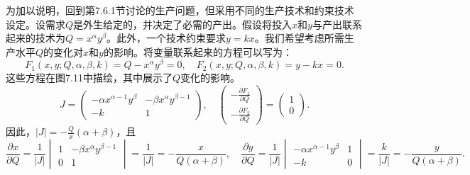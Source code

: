 \begin{translation}
为加以说明，回到第7.6.1节讨论的生产问题，但采用不同的生产技术和约束技术设定。设需求$Q$是外生给定的，并决定了必需的产出。假设将投入$x$和$y$与产出联系起来的技术为$Q = x^\alpha y^\beta$。此外，一个技术约束要求$y = kx$。我们希望考虑所需生产水平$Q$的变化对$x$和$y$的影响。将变量联系起来的方程可以写为：
\[
F_1(x, y; Q, \alpha, \beta, k) = Q - x^\alpha y^\beta = 0, \quad F_2(x, y; Q, \alpha, \beta, k) = y - kx = 0.
\]
这些方程在图7.11中描绘，其中展示了$Q$变化的影响。
\[
J = \begin{pmatrix}
-\alpha x^{\alpha-1} y^\beta & -\beta x^\alpha y^{\beta-1} \\
-k & 1
\end{pmatrix}, \quad
\begin{pmatrix} -\frac{\partial F_1}{\partial Q} \\[2pt] -\frac{\partial F_2}{\partial Q} \end{pmatrix}
= \begin{pmatrix} 1 \\ 0 \end{pmatrix}.
\]
因此，$|J| = -\frac{Q}{x}(\alpha + \beta)$，且
\[
\frac{\partial x}{\partial Q} = \frac{1}{|J|}\begin{vmatrix} 1 & -\beta x^\alpha y^{\beta-1} \\ 0 & 1 \end{vmatrix}
= \frac{1}{|J|} = -\frac{x}{Q(\alpha + \beta)}, \quad
\frac{\partial y}{\partial Q} = \frac{1}{|J|}\begin{vmatrix} -\alpha x^{\alpha-1} y^\beta & 1 \\ -k & 0 \end{vmatrix}
= \frac{k}{|J|} = -\frac{y}{Q(\alpha + \beta)}.
\]
\end{translation}

